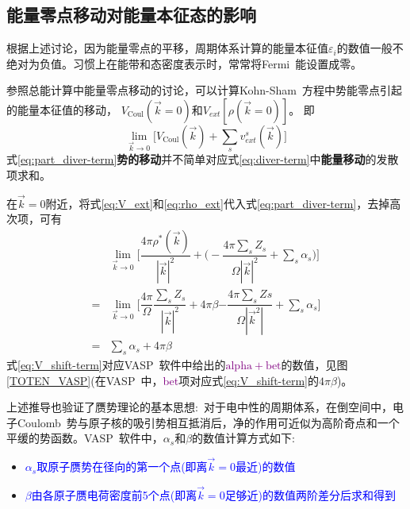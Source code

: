 \documentclass{article}      %
\begin{document}
\subsection{能量零点移动对能量本征态的影响}
根据上述讨论，因为能量零点的平移，周期体系计算的能量本征值$\varepsilon_i$的数值一般不绝对为负值。习惯上在能带和态密度表示时，常常将\textrm{Fermi~}能设置成零。

参照总能计算中能量零点移动的讨论，可以计算\textrm{Kohn-Sham~}方程中势能零点引起的能量本征值的移动，%
$V_{\mathrm{Coul}}(\vec k=0)$和$V_{ext}[\rho(\vec k=0)]$。
即
\begin{equation}
	\lim_{\vec k\rightarrow0}\bigg[V_{\mathrm{Coul}}(\vec k)+\sum_sv_{ext}^s(\vec k)\bigg]
	\label{eq:part_diver-term}
\end{equation}
式\eqref{eq:part_diver-term}\textbf{势的移动}并不简单对应式\eqref{eq:diver-term}中\textbf{能量移动}的发散项求和。

在$\vec k=0$附近，将式\eqref{eq:V_ext}和\eqref{eq:rho_ext}代入式\eqref{eq:part_diver-term}，去掉高次项，可有
\begin{equation}
	\begin{aligned}
		&\lim_{\vec k\rightarrow 0}\bigg[\dfrac{4\pi\rho^{\ast}(\vec k)}{|\vec k|^2}+\bigg(-\dfrac{4\pi\sum_sZ_s}{\Omega|\vec k|^2}+\sum_s\alpha_s\bigg)\bigg]\\
		=&\lim_{\vec k\rightarrow 0}\bigg[\boxed{\dfrac{4\pi}{\Omega}\dfrac{\sum_sZ_s}{|\vec k|^2}}+4\pi\beta\boxed{-\dfrac{4\pi\sum_sZs}{\Omega|\vec k^2|}}+\sum_s\alpha_s\bigg]\\
		=&\sum_s\alpha_s+4\pi\beta
	\end{aligned}
	\label{eq:V_shift-term}
\end{equation}
式\eqref{eq:V_shift-term}对应\textrm{VASP~}软件中给出的\textcolor{purple}{$\mathrm{alpha+bet}$}的数值，见图\ref{TOTEN_VASP}(在\textrm{VASP~}中，\textcolor{purple}{bet}项对应式\eqref{eq:V_shift-term}的$4\pi\beta$)。

上述推导也验证了赝势理论的基本思想:~对于电中性的周期体系，在倒空间中，电子\textrm{Coulomb~}势与原子核的吸引势相互抵消后，净的作用可近似为高阶奇点和一个平缓的势函数。\textrm{VASP~}软件中，$\alpha_s$和$\beta$的数值计算方式如下:~
\begin{itemize}
	\item \textcolor{blue}{$\alpha_s$取原子赝势在径向的第一个点(即离$\vec k=0$最近)的数值}
	\item \textcolor{blue}{$\beta$由各原子赝电荷密度前5个点(即离$\vec k=0$足够近)的数值两阶差分后求和得到}
\end{itemize}
\end{document}
